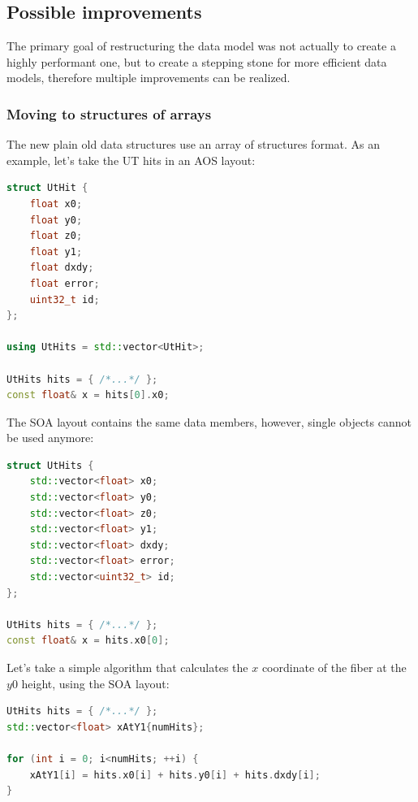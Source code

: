 \documentclass[12pt]{article}
\begin{document}
\subsection{Possible improvements}\label{sec_data_model_possible_improvements}

The primary goal of restructuring the data model was not actually to create a highly performant one, but to create a stepping stone for more efficient data models, therefore multiple improvements can be realized.

\subsubsection{Moving to structures of arrays}

The new plain old data structures use an array of structures format. As an example, let's take the UT hits in an AOS layout:

\begin{lstlisting}[language=C++]
struct UtHit {
	float x0;
	float y0;
	float z0;
	float y1;
	float dxdy;
	float error;
	uint32_t id;
};

using UtHits = std::vector<UtHit>;

UtHits hits = { /*...*/ };
const float& x = hits[0].x0;
\end{lstlisting}

The SOA layout contains the same data members, however, single objects cannot be used anymore:

\begin{lstlisting}[language=C++]
struct UtHits {
	std::vector<float> x0;
	std::vector<float> y0;
	std::vector<float> z0;
	std::vector<float> y1;
	std::vector<float> dxdy;
	std::vector<float> error;
	std::vector<uint32_t> id;
};

UtHits hits = { /*...*/ };
const float& x = hits.x0[0];
\end{lstlisting}

Let's take a simple algorithm that calculates the $x$ coordinate of the fiber at the $y0$ height, using the SOA layout:

\begin{lstlisting}[language=C++]
UtHits hits = { /*...*/ };
std::vector<float> xAtY1{numHits};

for (int i = 0; i<numHits; ++i) {
	xAtY1[i] = hits.x0[i] + hits.y0[i] + hits.dxdy[i];
}
\end{lstlisting}
\end{document}
